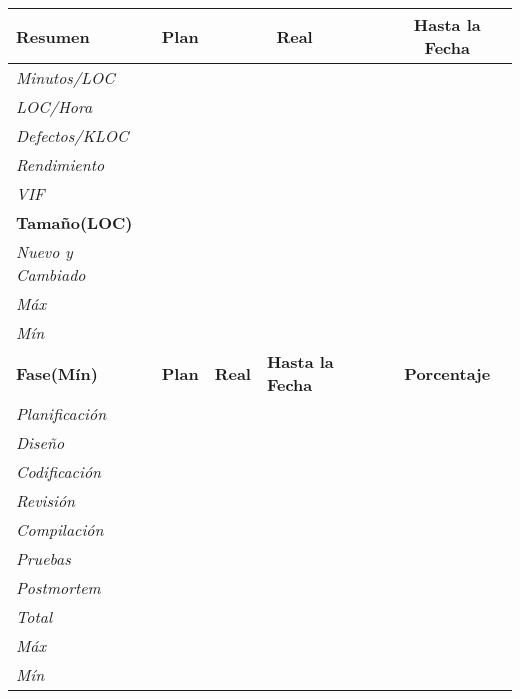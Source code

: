 \documentclass[a4paper,12pt,openany,oneside]{book}
\begin{document}
\begin{tabular}{| l | l | l | l | l | l |}
\hline
\textbf{Resumen} & \textbf{Plan} & \multicolumn{2}{|c|}{\textbf{Real}} & \multicolumn{2}{|c|}{\textbf{Hasta la Fecha}} \\
\hline
\textit{Minutos/LOC} & & \multicolumn{2}{|c|}{\textbf{}} & \multicolumn{2}{|c|}{\textbf{}} \\
\hline
\textit{LOC/Hora} & & \multicolumn{2}{|c|}{\textbf{}} & \multicolumn{2}{|c|}{\textbf{}} \\
\hline
\textit{Defectos/KLOC} & & \multicolumn{2}{|c|}{\textbf{}} & \multicolumn{2}{|c|}{\textbf{}} \\
\hline
\textit{Rendimiento} & & \multicolumn{2}{|c|}{\textbf{}} & \multicolumn{2}{|c|}{\textbf{}} \\
\hline
\textit{VIF} & & \multicolumn{2}{|c|}{\textbf{}} & \multicolumn{2}{|c|}{\textbf{}} \\
\hline
\textbf{Tamaño(LOC)} & \multicolumn{5}{|c|}{\textbf{}}\\
\hline
\textit{Nuevo y Cambiado} & & \multicolumn{2}{|c|}{\textbf{}} & \multicolumn{2}{|c|}{\textbf{}} \\
\hline
\textit{Máx} & & \multicolumn{4}{|c|}{\textbf{}}\\
\hline
\textit{Mín} & & \multicolumn{4}{|c|}{\textbf{}}\\
\hline
\textbf{Fase(Mín)} & \textbf{Plan} & \textbf{Real} & \textbf{Hasta la Fecha} & \multicolumn{2}{|c|}{\textbf{Porcentaje}} \\
\hline
\textit{Planificación} & & & & \multicolumn{2}{|c|}{\textbf{}}\\
\hline
\textit{Diseño} & & & & \multicolumn{2}{|c|}{\textbf{}}\\
\hline
\textit{Codificación} & & & & \multicolumn{2}{|c|}{\textbf{}}\\
\hline
\textit{Revisión} & & & & \multicolumn{2}{|c|}{\textbf{}}\\
\hline
\textit{Compilación} & & & & \multicolumn{2}{|c|}{\textbf{}}\\
\hline
\textit{Pruebas} & & & & \multicolumn{2}{|c|}{\textbf{}}\\
\hline
\textit{Postmortem} & & & & \multicolumn{2}{|c|}{\textbf{}}\\
\hline
\textit{Total} & & & & \multicolumn{2}{|c|}{\textbf{}}\\
\hline
\textit{Máx} & & \multicolumn{4}{|c|}{\textbf{}}\\
\hline
\textit{Mín} & & \multicolumn{4}{|c|}{\textbf{}}\\
\hline
\end{tabular}
\end{document}
